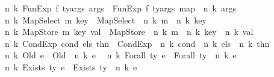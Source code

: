 \begin{isabellebody}
{\isacharbar}{\kern0pt}\ {\isachardoublequoteopen}{\isasymup}\ n\ k\ {\isacharparenleft}{\kern0pt}FunExp\ f\ ty{\isacharunderscore}{\kern0pt}args\ args{\isacharparenright}{\kern0pt}\ {\isacharequal}{\kern0pt}\ FunExp\ f\ ty{\isacharunderscore}{\kern0pt}args\ {\isacharparenleft}{\kern0pt}map\ {\isacharparenleft}{\kern0pt}{\isasymup}\ n\ k{\isacharparenright}{\kern0pt}\ args{\isacharparenright}{\kern0pt}{\isachardoublequoteclose}\isanewline
{\isacharbar}{\kern0pt}\ {\isachardoublequoteopen}{\isasymup}\ n\ k\ {\isacharparenleft}{\kern0pt}MapSelect\ m\ key{\isacharparenright}{\kern0pt}\ {\isacharequal}{\kern0pt}\ MapSelect\ {\isacharparenleft}{\kern0pt}{\isasymup}\ n\ k\ m{\isacharparenright}{\kern0pt}\ {\isacharparenleft}{\kern0pt}{\isasymup}\ n\ k\ key{\isacharparenright}{\kern0pt}{\isachardoublequoteclose}\isanewline
{\isacharbar}{\kern0pt}\ {\isachardoublequoteopen}{\isasymup}\ n\ k\ {\isacharparenleft}{\kern0pt}MapStore\ m\ key\ val{\isacharparenright}{\kern0pt}\ {\isacharequal}{\kern0pt}\ MapStore\ {\isacharparenleft}{\kern0pt}{\isasymup}\ n\ k\ m{\isacharparenright}{\kern0pt}\ {\isacharparenleft}{\kern0pt}{\isasymup}\ n\ k\ key{\isacharparenright}{\kern0pt}\ {\isacharparenleft}{\kern0pt}{\isasymup}\ n\ k\ val{\isacharparenright}{\kern0pt}{\isachardoublequoteclose}\isanewline
{\isacharbar}{\kern0pt}\ {\isachardoublequoteopen}{\isasymup}\ n\ k\ {\isacharparenleft}{\kern0pt}CondExp\ cond\ els\ thn{\isacharparenright}{\kern0pt}\ {\isacharequal}{\kern0pt}\ CondExp\ {\isacharparenleft}{\kern0pt}{\isasymup}\ n\ k\ cond{\isacharparenright}{\kern0pt}\ {\isacharparenleft}{\kern0pt}{\isasymup}\ n\ k\ els{\isacharparenright}{\kern0pt}\ {\isacharparenleft}{\kern0pt}{\isasymup}\ n\ k\ thn{\isacharparenright}{\kern0pt}{\isachardoublequoteclose}\isanewline
{\isacharbar}{\kern0pt}\ {\isachardoublequoteopen}{\isasymup}\ n\ k\ {\isacharparenleft}{\kern0pt}Old\ e{\isacharparenright}{\kern0pt}\ {\isacharequal}{\kern0pt}\ Old\ {\isacharparenleft}{\kern0pt}{\isasymup}\ n\ k\ e{\isacharparenright}{\kern0pt}{\isachardoublequoteclose}\isanewline
{\isacharbar}{\kern0pt}\ {\isachardoublequoteopen}{\isasymup}\ n\ k\ {\isacharparenleft}{\kern0pt}Forall\ ty\ e{\isacharparenright}{\kern0pt}\ {\isacharequal}{\kern0pt}\ {\isacharparenleft}{\kern0pt}Forall\ ty\ {\isacharparenleft}{\kern0pt}{\isasymup}\ n\ {\isacharparenleft}{\kern0pt}k{\isacharplus}{\kern0pt}{}{\isacharparenright}{\kern0pt}\ e{\isacharparenright}{\kern0pt}{\isacharparenright}{\kern0pt}{\isachardoublequoteclose}\isanewline
{\isacharbar}{\kern0pt}\ {\isachardoublequoteopen}{\isasymup}\ n\ k\ {\isacharparenleft}{\kern0pt}Exists\ ty\ e{\isacharparenright}{\kern0pt}\ {\isacharequal}{\kern0pt}\ {\isacharparenleft}{\kern0pt}Exists\ ty\ {\isacharparenleft}{\kern0pt}{\isasymup}\ n\ {\isacharparenleft}{\kern0pt}k{\isacharplus}{\kern0pt}{}{\isacharparenright}{\kern0pt}\ e{\isacharparenright}{\kern0pt}{\isacharparenright}{\kern0pt}{\isachardoublequoteclose}\isanewline

\end{isabellebody}
